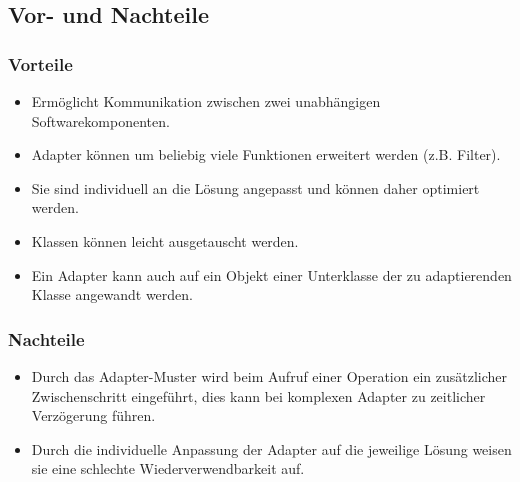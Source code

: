 \documentclass[12pt,a4paper,titlepage]{article}
\theoremstyle{definition}
\begin{document}

\newpage




\newpage





\subsection{Vor- und Nachteile}
\subsubsection{Vorteile}
\begin{itemize}
	\item Ermöglicht Kommunikation zwischen zwei unabhängigen Softwarekomponenten.
	\item Adapter können um beliebig viele Funktionen erweitert werden (z.B. Filter).
	\item Sie sind individuell an die Lösung angepasst und können daher optimiert werden.
	\item Klassen können leicht ausgetauscht werden.
	\item Ein Adapter kann auch auf ein Objekt einer Unterklasse der zu adaptierenden Klasse angewandt werden.
\end{itemize}

\subsubsection{Nachteile}
\begin{itemize}
	\item Durch das Adapter-Muster wird beim Aufruf einer Operation ein zusätzlicher Zwischenschritt eingeführt, dies kann bei komplexen Adapter zu zeitlicher
	Verzögerung führen.
	\item Durch die individuelle Anpassung der Adapter auf die jeweilige Lösung weisen sie eine schlechte Wiederverwendbarkeit auf.
\end{itemize}
\end{document}
